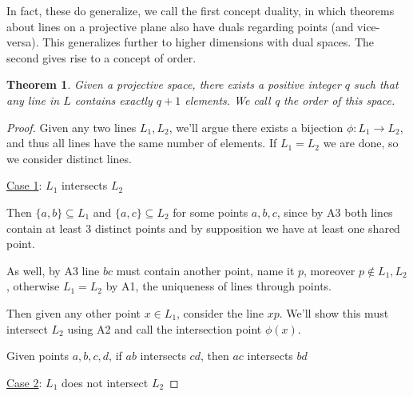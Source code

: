 \documentclass[12pt]{article}
\newtheorem{theorem}{Theorem}
\begin{document}
    In fact, these do generalize, we call the first concept duality,
    in which theorems about lines on a projective plane also have duals regarding points (and vice-versa).
    This generalizes further to higher dimensions with dual spaces.
    The second gives rise to a concept of order\cite[p. 24]{beutelspacher_projective_2000}.

    \begin{theorem}
        Given a projective space, there exists a positive integer $q$ such that any line in $L$ contains exactly $q+1$ elements.
        We call q the order of this space.
    \end{theorem}

    \begin{proof}
        Given any two lines $L_1, L_2$, we'll argue there exists a bijection $\phi: L_1 \rightarrow L_2$,
        and thus all lines have the same number of elements.
        If $L_1 = L_2$ we are done, so we consider distinct lines.

        \underline{Case 1}: $L_1$ intersects $L_2$

        Then $\{a, b\} \subseteq L_1$ and $\{a, c\} \subseteq L_2$ for some points $a,b,c$,
        since by A3 both lines contain at least 3 distinct points and by supposition we have at least one shared point.

        As well, by A3 line $bc$ must contain another point, name it $p$, moreover $p \notin L_1, L_2$,
        otherwise $L_1 = L_2$ by A1, the uniqueness of lines through points.

        Then given any other point $x \in L_1$, consider the line $xp$.
        We'll show this must intersect $L_2$ using A2 and call the intersection point $\phi(x)$.

        \begin{figure}[h]
            \centering
            \label{fig:intersecting_lines}
        \end{figure}

        Given points $a,b,c,d$, if $ab$ intersects $cd$, then $ac$ intersects $bd$

        \underline{Case 2}: $L_1$ does not intersect $L_2$
    \end{proof}
\end{document}
